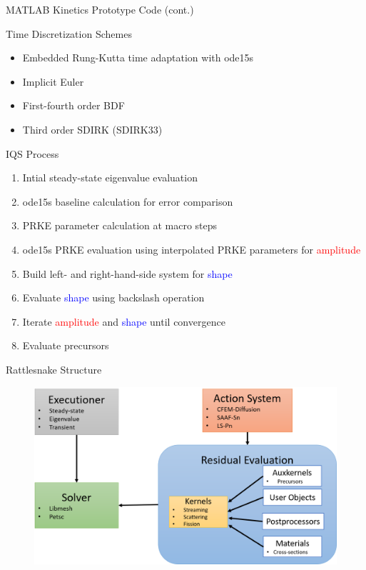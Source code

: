 \documentclass[8pt,xcolor=dvipnames]{beamer}
\newcommand{\tcr}[1]{\textcolor{red}{#1}}
\newcommand{\tcb}[1]{\textcolor{blue}{#1}}
\begin{document}
\begin{frame}{MATLAB Kinetics Prototype Code (cont.)}

\begin{block}{Time Discretization Schemes}
\begin{itemize}
\item Embedded Rung-Kutta time adaptation with ode15s
\item Implicit Euler
\item First-fourth order BDF
\item Third order SDIRK (SDIRK33)
\end{itemize}
\end{block}

\begin{block}{IQS Process}
\begin{enumerate}
\item Intial steady-state eigenvalue evaluation
\item ode15s baseline calculation for error comparison
\item PRKE parameter calculation at macro steps
\item ode15s PRKE evaluation using interpolated PRKE parameters for \tcr{amplitude}
\item Build left- and right-hand-side system for \tcb{shape}
\item Evaluate \tcb{shape} using backslash operation
\item Iterate \tcr{amplitude} and \tcb{shape} until convergence
\item Evaluate precursors
\end{enumerate}
\end{block}

\end{frame}

\begin{frame}{Rattlesnake Structure}

\begin{figure}
\includegraphics[width=\linewidth,height=\textheight,keepaspectratio]{figures/rattlesnake.png}
\end{figure}

\end{frame}
\end{document}
